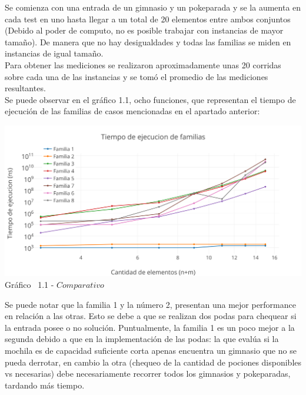 Se comienza con una entrada de un gimnasio y un pokeparada y se la aumenta en cada test en uno hasta llegar a un total de 20 elementos entre ambos conjuntos (Debido al poder de computo, no es posible trabajar con instancias de mayor tamaño). De manera que no hay desigualdades y todas las familias se miden en instancias de igual tamaño.\\

Para obtener las mediciones se realizaron aproximadamente unas 20 corridas sobre cada una de las instancias y se tom\'o el promedio de las mediciones resultantes.\\ 

Se puede observar en el  gráfico 1.1, ocho funciones, que representan el tiempo de ejecuci\'on de las familias de casos mencionadas en el apartado anterior:\\


\vspace*{0.3cm} \vspace*{0.3cm}
  \begin{center}
 \includegraphics[scale=0.65]{./EJ1/comparativo.png}
 {Gr\'afico \ 1.1 - $Comparativo$}
  \end{center}
  \vspace*{0.3cm}

  
Se puede notar que la familia 1 y la n\'umero 2, presentan una mejor performance en relaci\'on a las otras. Esto se debe a que se realizan dos podas para chequear si la entrada posee o no soluci\'on. Puntualmente, la familia 1 es un poco mejor a la segunda debido a que en la implementaci\'on de las podas: la que evalúa si la mochila es de capacidad suficiente corta apenas encuentra un gimnasio que no se pueda derrotar, en cambio la otra (chequeo de la cantidad de pociones disponibles vs necesarias) debe necesariamente recorrer todos los gimnasios y pokeparadas, tardando más tiempo.



